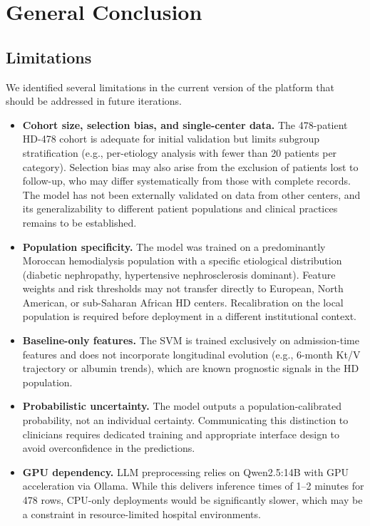 \documentclass[12pt,a4paper,twoside]{report}
\begin{document}
\chapter*{General Conclusion}

\section*{Limitations}

We identified several limitations in the current version of the platform that should be addressed in future iterations.

\begin{itemize}
  \item \textbf{Cohort size, selection bias, and single-center data.} The 478-patient HD-478 cohort is adequate for initial validation but limits subgroup stratification (e.g., per-etiology analysis with fewer than 20 patients per category). Selection bias may also arise from the exclusion of patients lost to follow-up, who may differ systematically from those with complete records. The model has not been externally validated on data from other centers, and its generalizability to different patient populations and clinical practices remains to be established.
  \item \textbf{Population specificity.} The model was trained on a predominantly Moroccan hemodialysis population with a specific etiological distribution (diabetic nephropathy, hypertensive nephrosclerosis dominant). Feature weights and risk thresholds may not transfer directly to European, North American, or sub-Saharan African HD centers. Recalibration on the local population is required before deployment in a different institutional context.
  \item \textbf{Baseline-only features.} The SVM is trained exclusively on admission-time features and does not incorporate longitudinal evolution (e.g., 6-month Kt/V trajectory or albumin trends), which are known prognostic signals in the HD population.
  \item \textbf{Probabilistic uncertainty.} The model outputs a population-calibrated probability, not an individual certainty. Communicating this distinction to clinicians requires dedicated training and appropriate interface design to avoid overconfidence in the predictions.
  \item \textbf{GPU dependency.} LLM preprocessing relies on Qwen2.5:14B with GPU acceleration via Ollama. While this delivers inference times of 1--2 minutes for 478 rows, CPU-only deployments would be significantly slower, which may be a constraint in resource-limited hospital environments.
\end{itemize}
\end{document}
